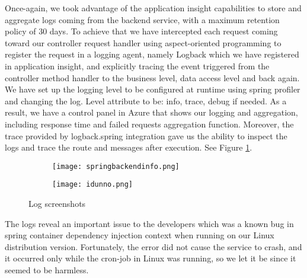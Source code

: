 Once-again, we took advantage of the application insight capabilities to store and aggregate logs coming from the backend service, with a maximum retention policy of 30 days. To achieve that we have intercepted each request coming toward our controller request handler using aspect-oriented programming to register the request in a logging agent, namely Logback which we have registered in application insight, and explicitly tracing the event triggered from the controller method handler to the business level, data access level and back again. We have set up the logging level to be configured at runtime using spring profiler and changing the log. Level attribute to be: info, trace, debug if needed. As a result, we have a control panel in Azure that shows our logging and aggregation, including response time and failed requests aggregation function. Moreover, the trace provided by logback.spring integration gave us the ability to inspect the logs and trace the route and messages after execution. See Figure \ref{fig:screenshots}.
\begin{figure}[H]
    \centering
    \begin{subfigure}[b]{0.45\textwidth}
        \texttt{[image: springbackendinfo.png]}
    \end{subfigure}
    \hfill
    \begin{subfigure}[b]{0.45\textwidth}
        \texttt{[image: idunno.png]}
    \end{subfigure}
    \caption{Log screenshots}
    \label{fig:screenshots}
\end{figure}
The logs reveal an important issue to the developers which was a known bug in spring container dependency injection context when running on our Linux distribution version. Fortunately, the error did not cause the service to crash, and it occurred only while the cron-job in Linux was running, so we let it be since it seemed to be harmless.
